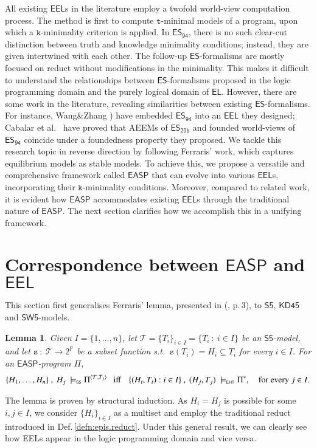 \documentclass[submission,copyright,creativecommons]{eptcs}
\newcommand{\tuple}[1]  { \langle #1 \rangle }
\newcommand{\Prop}  { \mathbb{P} }
\newcommand{\suchthat}  { \ : \ }
\newcommand{\set}[1]  { \{ #1 \} }
\newcommand{\logic}[1]  { \ensuremath{\mathsf{#1}} }
\newcommand{\sfive}  { \logic{S5} }
\newcommand{\KD}  { \logic{KD45} }
\newcommand{\SW}  { \logic{SW5} }
\newcommand{\EHT}  { \logic{EHT} }
\newcommand{\EL}  { \logic{EL} }
\newcommand{\ES}  { \logic{ES} }
\newcommand{\EASP}  { \logic{EASP} }
\newcommand{\EEL}  { \logic{EEL} }
\newcommand{\epispec}  { \Pi }
\newcommand{\ESdoksandort}  { \logic{ES_{\scriptscriptstyle{94}} } }
\newcommand{\ESyirmib}  { \logic{ES_{\scriptscriptstyle{20b}} } }
\newcommand{\weak}  { \texttt{s} }
\newcommand{\Ehtmodels}  { \models_{\scriptscriptstyle \EHT} }
\newcommand{\sfivemodels}  { \models_{\scriptscriptstyle{\sfive}} }
\newtheorem{lem}{Lemma}
\begin{document}
All existing $\EEL$s in the literature
employ a twofold world-view computation process. The method
is first to compute $\texttt{t}$-minimal models of a program, upon which a $\texttt{k}$-minimality criterion is applied.
In $\ESdoksandort$,
there is no such clear-cut distinction between truth and knowledge minimality conditions; 
instead, they are given intertwined with each other. The follow-up $\ES$-formalisms are 
mostly focused on reduct without modifications in the minimality. 
This makes it difficult to understand
the relationships between $\ES$-formalisms proposed in the logic programming domain 
and the purely logical domain of $\EL$. However, there are some work in the literature, 
revealing similarities between existing $\ES$-formalisms. For instance,
Wang\&Zhang \cite{WangZ05nested}) have embedded $\ESdoksandort$ into an $\EEL$
they designed;
Cabalar et al.\ \cite{Cabalar20} have proved that
AEEMs of $\ESyirmib$ and founded world-views of $\ESdoksandort$ coincide 
under a foundedness property they proposed. We tackle this research topic
in reverse direction by following Ferraris' work, which captures equilibrium models as stable models. 
To achieve this, we propose a versatile and comprehensive framework called 
$\EASP$ that can evolve into various $\EEL$s, incorporating their $\texttt{k}$-minimality conditions. 
Moreover, compared to related work, it is evident how $\EASP$ accommodates existing 
$\EEL$s through the traditional nature of $\EASP$. 
The next section clarifies how we accomplish this in a unifying framework.

\section{Correspondence between \texorpdfstring{$\EASP$}{EASP} 
and \texorpdfstring{$\EEL$}{EEL} }
\label{sec:correspondence}
This section first generalises Ferraris' lemma, presented in (\cite{Ferraris05a}, p.\,3), 
to $\sfive$, $\KD$ and $\SW$-models.
%
\begin{lem}\label{lem:Ferraris}
Given $I=\set{1, \ldots , n}$,
let $\mathcal T = \set{T_i}_{i \in I} =\set{T_i \suchthat i \in I}$ be an
$\sfive$-model, and
let $\weak\suchthat \mathcal T \rightarrow 2^{\Prop} $ be a subset function s.t.\ $\weak(T_i)=H_i \subseteq T_i$ for every $i \in I$.
For an $\EASP$-program $\epispec$, 
%
\begin{align*}
\set{H_1, \ldots, H_n}~,~H_j~\sfivemodels \epispec^{\tuple{\mathcal T, T_j}} 
\text{ \  \ iff \,  \ }
\set{(H_i,T_i) : i \in I}~,~(H_j,T_j)~\Ehtmodels \epispec^*, 
\text{ \ \ \ for every $j\in I$.}
\end{align*}
\end{lem}
%
The lemma is proven by structural induction. 
As $H_i = H_j$ is possible for some $i,j \in I$, 
we consider $\set{H_i}_{i\in I}$ as a multiset and employ the traditional 
reduct introduced in Def.\,\ref{defn:epis.reduct}. Under this general result, we can clearly see
how EELs appear in the logic programming domain and vice versa. 
\end{document}
